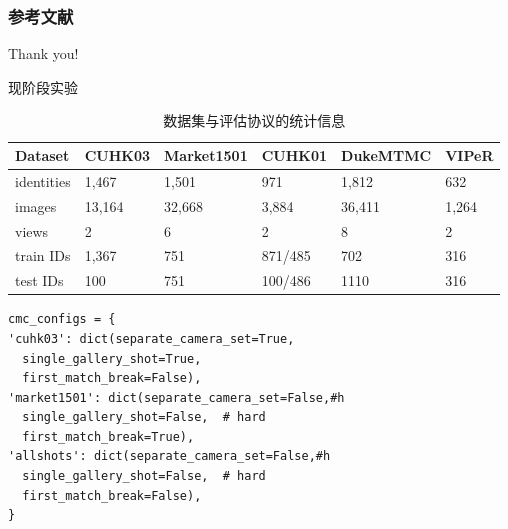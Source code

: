 \documentclass[notes]{beamer}
\newcommand{\chuhao}{\fontsize{44.9pt}{\baselineskip}\selectfont}
\begin{document}
\begin{frame}[t, allowframebreaks]

\frametitle{参考文献}


\printbibliography
\end{frame}

\begin{frame}
	\chuhao Thank you! %
\end{frame}



\begin{frame}{现阶段实验}
	\begin{table}
		\centering
		\caption{数据集与评估协议的统计信息}
		\label{table:dataset}
		\begin{tabular}{llllll}
			\toprule
			Dataset    & CUHK03 & Market1501 & CUHK01  & DukeMTMC & VIPeR \\
			\midrule
			identities & 1,467  & 1,501      & 971     & 1,812    & 632   \\
			images     & 13,164 & 32,668     & 3,884   & 36,411   & 1,264 \\
			views      & 2      & 6          & 2       & 8        & 2     \\
			train IDs  & 1,367  & 751        & 871/485 & 702      & 316   \\
			test IDs   & 100    & 751        & 100/486 & 1110     & 316   \\
			\bottomrule
		\end{tabular}
	\end{table}
\end{frame}

\begin{frame}[fragile]
	
\begin{lstlisting}
cmc_configs = {
'cuhk03': dict(separate_camera_set=True,
  single_gallery_shot=True,
  first_match_break=False),
'market1501': dict(separate_camera_set=False,#h
  single_gallery_shot=False,  # hard
  first_match_break=True),
'allshots': dict(separate_camera_set=False,#h
  single_gallery_shot=False,  # hard
  first_match_break=False),
}
\end{lstlisting}
\end{frame}
\end{document}
